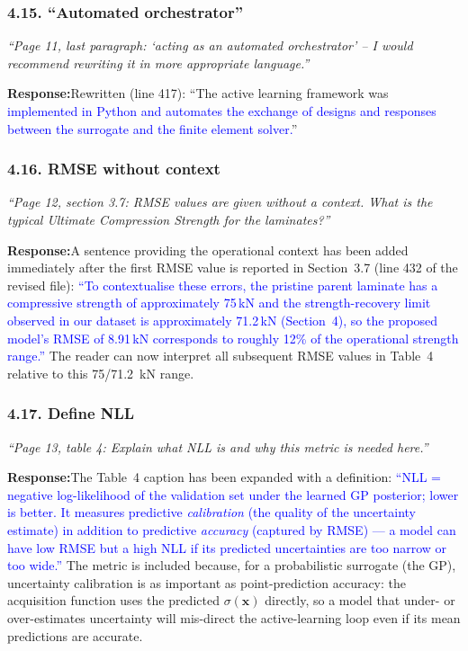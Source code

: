 \documentclass[11pt,a4paper]{article}
\newcommand{\new}[1]{\textcolor{blue}{#1}}
\newcommand{\rev}[1]{\par\noindent\textit{\small #1}\par\smallskip}
\newcommand{\resp}{\par\noindent\textbf{Response:}\space}
\begin{document}
\subsubsection*{4.15. ``Automated orchestrator''}
\rev{``Page 11, last paragraph: `acting as an automated orchestrator' -- I would recommend rewriting it in more appropriate language.''}
\resp Rewritten (line 417): ``The active learning framework was \new{implemented in Python and automates the exchange of designs and responses between the surrogate and the finite element solver.}''

\subsubsection*{4.16. RMSE without context}
\rev{``Page 12, section 3.7: RMSE values are given without a context. What is the typical Ultimate Compression Strength for the laminates?''}
\resp A sentence providing the operational context has been added immediately after the first RMSE value is reported in Section~3.7 (line 432 of the revised file): \new{``To contextualise these errors, the pristine parent laminate has a compressive strength of approximately 75\,kN and the strength-recovery limit observed in our dataset is approximately 71.2\,kN (Section~4), so the proposed model's RMSE of 8.91\,kN corresponds to roughly 12\% of the operational strength range.''} The reader can now interpret all subsequent RMSE values in Table~4 relative to this 75/71.2~kN range.

\subsubsection*{4.17. Define NLL}
\rev{``Page 13, table 4: Explain what NLL is and why this metric is needed here.''}
\resp The Table~4 caption has been expanded with a definition: \new{``NLL = negative log-likelihood of the validation set under the learned GP posterior; lower is better. It measures predictive \emph{calibration} (the quality of the uncertainty estimate) in addition to predictive \emph{accuracy} (captured by RMSE) --- a model can have low RMSE but a high NLL if its predicted uncertainties are too narrow or too wide.''} The metric is included because, for a probabilistic surrogate (the GP), uncertainty calibration is as important as point-prediction accuracy: the acquisition function uses the predicted $\sigma(\mathbf{x})$ directly, so a model that under- or over-estimates uncertainty will mis-direct the active-learning loop even if its mean predictions are accurate.
\end{document}

